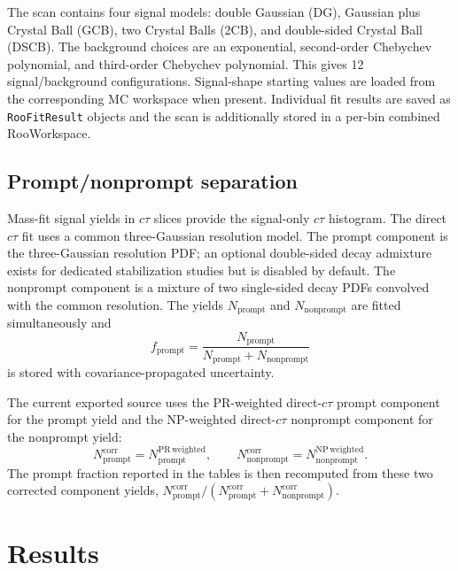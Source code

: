 \documentclass[11pt]{article}
\begin{document}
The scan contains four signal models: double Gaussian (DG), Gaussian plus Crystal Ball (GCB), two Crystal Balls (2CB), and double-sided Crystal Ball (DSCB). The background choices are an exponential, second-order Chebychev polynomial, and third-order Chebychev polynomial. This gives 12 signal/background configurations. Signal-shape starting values are loaded from the corresponding MC workspace when present. Individual fit results are saved as \texttt{RooFitResult} objects and the scan is additionally stored in a per-bin combined RooWorkspace.

\subsection{Prompt/nonprompt separation}

Mass-fit signal yields in $c\tau$ slices provide the signal-only $c\tau$ histogram. The direct $c\tau$ fit uses a common three-Gaussian resolution model. The prompt component is the three-Gaussian resolution PDF; an optional double-sided decay admixture exists for dedicated stabilization studies but is disabled by default. The nonprompt component is a mixture of two single-sided decay PDFs convolved with the common resolution. The yields $N_\mathrm{prompt}$ and $N_\mathrm{nonprompt}$ are fitted simultaneously and
\begin{equation}
f_\mathrm{prompt}=\frac{N_\mathrm{prompt}}{N_\mathrm{prompt}+N_\mathrm{nonprompt}}
\end{equation}
is stored with covariance-propagated uncertainty.

The current exported source uses the PR-weighted direct-$c\tau$ prompt component for the prompt yield and the NP-weighted direct-$c\tau$ nonprompt component for the nonprompt yield:
\begin{equation}
N_\mathrm{prompt}^\mathrm{corr}=N_\mathrm{prompt}^{\mathrm{PR}\,\mathrm{weighted}},\qquad
N_\mathrm{nonprompt}^\mathrm{corr}=N_\mathrm{nonprompt}^{\mathrm{NP}\,\mathrm{weighted}}.
\end{equation}
The prompt fraction reported in the tables is then recomputed from these two corrected component yields, $N_\mathrm{prompt}^\mathrm{corr}/(N_\mathrm{prompt}^\mathrm{corr}+N_\mathrm{nonprompt}^\mathrm{corr})$.

\section{Results}


\end{document}
